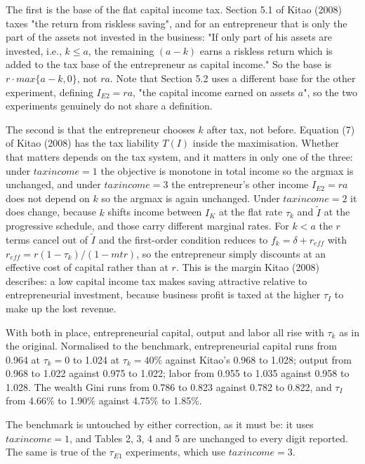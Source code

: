 \documentclass[11pt,fleqn]{article}
\begin{document}
The first is the base of the flat capital income tax. Section 5.1 of Kitao (2008) taxes "the return from riskless saving", and for an entrepreneur that is only the part of the assets not invested in the business: "If only part of his assets are invested, i.e., $k \leq a$, the remaining $(a-k)$ earns a riskless return which is added to the tax base of the entrepreneur as capital income." So the base is $r \cdot max\{a-k,0\}$, not $r a$. Note that Section 5.2 uses a different base for the other experiment, defining $I_{E2}=ra$, "the capital income earned on assets $a$", so the two experiments genuinely do not share a definition.

The second is that the entrepreneur chooses $k$ after tax, not before. Equation (7) of Kitao (2008) has the tax liability $T(I)$ inside the maximisation. Whether that matters depends on the tax system, and it matters in only one of the three: under $taxincome=1$ the objective is monotone in total income so the argmax is unchanged, and under $taxincome=3$ the entrepreneur's other income $I_{E2}=ra$ does not depend on $k$ so the argmax is again unchanged. Under $taxincome=2$ it does change, because $k$ shifts income between $I_K$ at the flat rate $\tau_k$ and $\tilde{I}$ at the progressive schedule, and those carry different marginal rates. For $k<a$ the $r$ terms cancel out of $\tilde{I}$ and the first-order condition reduces to $f_k = \delta + r_{eff}$ with $r_{eff}=r(1-\tau_k)/(1-mtr)$, so the entrepreneur simply discounts at an effective cost of capital rather than at $r$. This is the margin Kitao (2008) describes: a low capital income tax makes saving attractive relative to entrepreneurial investment, because business profit is taxed at the higher $\tau_I$ to make up the lost revenue.

With both in place, entrepreneurial capital, output and labor all rise with $\tau_k$ as in the original. Normalised to the benchmark, entrepreneurial capital runs from 0.964 at $\tau_k=0$ to 1.024 at $\tau_k=40\%$ against Kitao's 0.968 to 1.028; output from 0.968 to 1.022 against 0.975 to 1.022; labor from 0.955 to 1.035 against 0.958 to 1.028. The wealth Gini runs from 0.786 to 0.823 against 0.782 to 0.822, and $\tau_I$ from 4.66\% to 1.90\% against 4.75\% to 1.85\%.

The benchmark is untouched by either correction, as it must be: it uses $taxincome=1$, and Tables 2, 3, 4 and 5 are unchanged to every digit reported. The same is true of the $\tau_{E1}$ experiments, which use $taxincome=3$.
\end{document}
